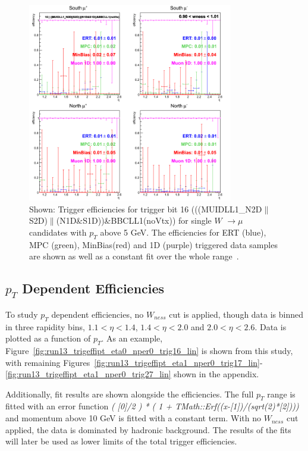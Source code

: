 \begin{figure}[ht]
  \centering
  \includegraphics[width=0.8\textwidth]{./figures/run13_trigeffieta_w1_trig16_lin.png}
  \caption{
    Shown: Trigger efficiencies for trigger bit 16
    (((MUIDLL1\_N2D$\|$S2D)$\|$(N1D\&S1D))\&BBCLL1(noVtx)) for single $W$
    $\rightarrow \mu$ candidates with $p_T$ above 5 GeV. The
    efficiencies for ERT (blue), MPC (green), MinBias(red) and 1D (purple)
    triggered data samples are shown as well as a constant fit over the whole
    range~\cite{Seidl2014}.
  }
  \label{fig:run13_trigeffieta_w0_nper0_trig16_lin} 
\end{figure}

\clearpage
\subsection{$p_T$ Dependent Efficiencies}
To study $p_T$ dependent efficiencies, no $W_{ness}$ cut is
applied, though data is binned in three rapidity bins, $1.1 < \eta < 1.4$, $1.4
< \eta < 2.0$ and $2.0 < \eta < 2.6 $. Data is plotted as a function of $p_T$.
As an example, Figure~\ref{fig:run13_trigeffipt_eta0_nper0_trig16_lin} is shown
from this study, with remaining
Figures~\ref{fig:run13_trigeffipt_eta1_nper0_trig17_lin}-\ref{fig:run13_trigeffipt_eta1_nper0_trig27_lin}
shown in the appendix.

Additionally, fit results are shown alongside the efficiencies. The full
$p_T$ range is fitted with an error function {\it ( [0]/2 ) * ( 1
+ TMath::Erf((x-[1])/(sqrt(2)*[2])))} and momentum above 10 GeV is fitted with a
constant term. With no $W_{ness}$ cut applied, the data is dominated by hadronic
background. The results of the fits will later be used as lower limits of the
total trigger efficiencies. 

